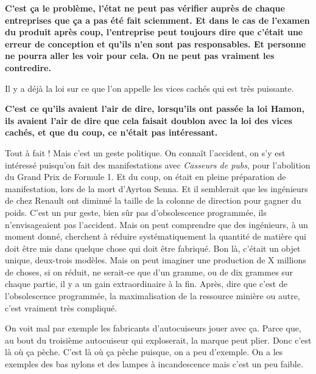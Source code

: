 \begin{small}
\textbf{C'est ça le problème, l'état ne peut pas vérifier auprès de chaque entreprises que ça a pas été fait sciemment. Et dans le cas de l'examen du produit après coup, l'entreprise peut toujours dire que c'était une erreur de conception et qu’ils n’en sont pas responsables. Et personne ne pourra aller les voir pour cela. On ne peut pas vraiment les contredire.}

\vspace{1\baselineskip}

Il y a déjà la loi sur ce que l'on appelle les vices cachés qui est très puissante.

\vspace{1\baselineskip}

\textbf{C'est ce qu'ils avaient l'air de dire, lorsqu'ils ont passée la loi Hamon, ils avaient l'air de dire que cela faisait doublon avec la loi des vices cachés, et que du coup, ce n'était pas intéressant.}

\vspace{1\baselineskip}

Tout à fait ! Mais c'est un geste politique. On connaît l'accident, on s'y est intéressé puisqu'on fait des manifestations avec \textit{Casseurs de pubs}, pour l'abolition du Grand Prix de Formule 1. Et du coup, on était en pleine préparation de manifestation, lors de la mort d'Ayrton Senna. Et il semblerait que les ingénieurs de chez Renault ont diminué la taille de la colonne de direction pour gagner du poids. C'est un pur geste, bien sûr pas d'obsolescence programmée, ils n'envisageaient pas l'accident. Mais on peut comprendre que des ingénieurs, à un moment donné, cherchent à réduire systématiquement la quantité de matière qui doit être mis dans quelque chose qui doit être fabriqué. Bon là, c'était un objet unique, deux-trois modèles. Mais on peut imaginer une production de X millions de choses, si on réduit, ne serait-ce que d'un gramme, ou de dix grammes sur chaque partie, il y a un gain extraordinaire à la fin. Après, dire que c'est de l'obsolescence programmée, la maximalisation de la ressource minière ou autre, c'est vraiment très compliqué.

On voit mal par exemple les fabricants d'autocuiseurs jouer avec ça. Parce que, au bout du troisième autocuiseur qui exploserait, la marque peut plier. Donc c'est là où ça pèche. C'est là où ça pèche puisque, on a peu d'exemple. On a les exemples des bas nylons et des lampes à incandescence mais c'est un peu faible.

\vspace{1\baselineskip}


\end{small}
